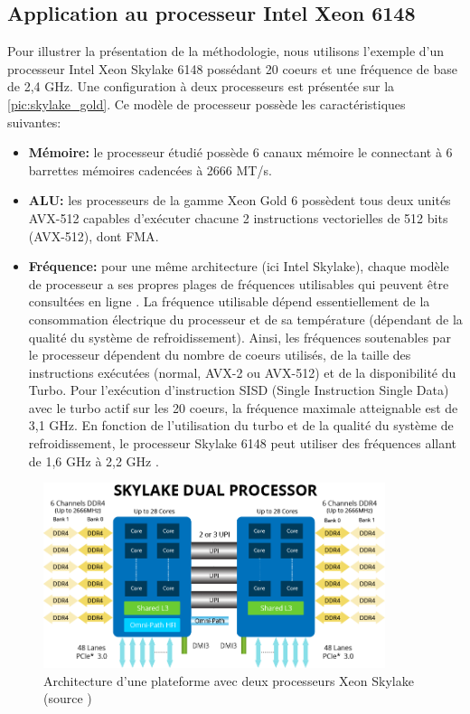 \subsection{Application au processeur Intel Xeon 6148}
    
    Pour illustrer la présentation de la méthodologie, nous utilisons l'exemple d'un processeur Intel Xeon Skylake 6148 possédant 20 coeurs et une fréquence de base de 2,4 GHz. Une configuration à deux processeurs est présentée sur la \autoref{pic:skylake_gold}. Ce modèle de processeur possède les caractéristiques suivantes:
    \begin{itemize}
        \item \textbf{Mémoire: } le processeur étudié possède 6 canaux mémoire le connectant à 6 barrettes mémoires cadencées à 2666 MT/s. 
        \item \textbf{ALU:} les processeurs de la gamme Xeon Gold 6 possèdent tous deux unités AVX-512 capables d'exécuter chacune 2 instructions vectorielles de 512 bits (AVX-512), dont \gls{FMA}.
        \item \textbf{Fréquence:} pour une même architecture (ici Intel Skylake), chaque modèle de processeur a ses propres plages de fréquences utilisables qui peuvent être consultées en ligne \cite{Wikichipa}. La fréquence utilisable dépend essentiellement de la consommation électrique du processeur et de sa température (dépendant de la qualité du système de refroidissement). Ainsi, les fréquences soutenables par le processeur dépendent du nombre de coeurs utilisés, de la taille des instructions  exécutées (normal, AVX-2 ou AVX-512) et de la disponibilité du Turbo. Pour l'exécution d'instruction SISD (Single Instruction Single Data) avec le turbo actif sur les 20 coeurs, la fréquence maximale atteignable est de 3,1 GHz.    En fonction de l'utilisation du turbo et de la qualité du système de refroidissement, le processeur Skylake 6148 peut utiliser des fréquences allant de 1,6 GHz à 2,2 GHz \cite{Wikichipa}. 
    \end{itemize}
       
    
 
    
    \begin{figure}
        \center
        \includegraphics[width=10cm]{images/skylake_gold.png}
        \caption{\label{pic:skylake_gold} Architecture d'une plateforme avec deux processeurs Xeon Skylake (source \cite{Aspsys})}
    \end{figure}
    
